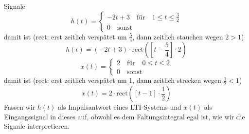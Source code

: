 \begin{Ansatz}
Signale
\begin{equation}
h(t) =
\begin{cases}
-2 t + 3 \quad \mathrm{für} \quad 1 \leq t \leq \frac{3}{2}\\
0 \quad \mathrm{sonst}
\end{cases}
\end{equation}
damit ist (rect: erst zeitlich verspätet um $\frac{5}{4}$, dann zeitlich
stauchen wegen $2>1$)
\begin{equation}
h(t) = (-2 t + 3) \cdot \mathrm{rect}\left(\left[t-\frac{5}{4}\right] \cdot 2\right)
\end{equation}
\begin{equation}
x(t)=
\begin{cases}
  2 \quad \mathrm{für} \quad 0 \leq t \leq 2\\
  0 \quad \mathrm{sonst}
\end{cases}
\end{equation}
damit ist (rect: erst zeitlich verspätet um 1, dann zeitlich strecken wegen
$\frac{1}{2}<1$)
\begin{equation}
x(t) = 2\cdot\mathrm{rect}\left(\left[t-1\right] \cdot \frac{1}{2}\right)
\end{equation}
Fassen wir $h(t)$ als Impulsantwort eines LTI-Systems und $x(t)$ als
Eingangssignal in dieses auf, obwohl es dem Faltungsintegral egal ist, wie wir
die Signale interpretieren.
\end{Ansatz}


